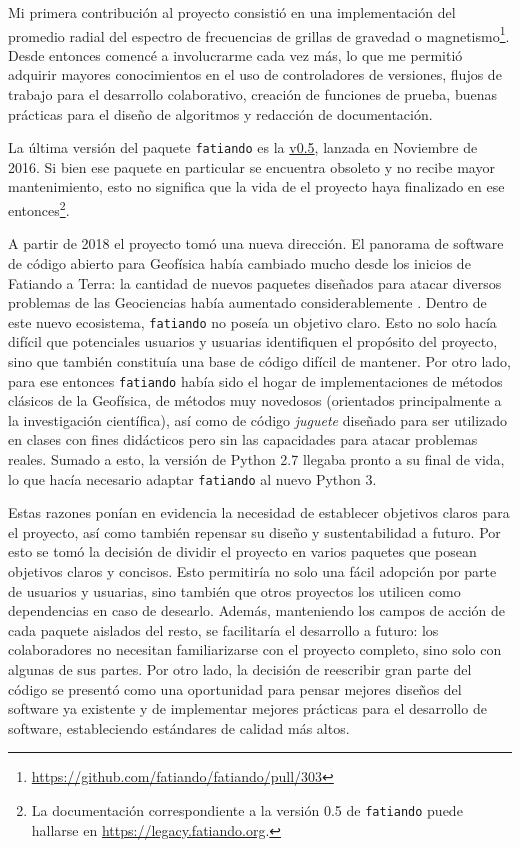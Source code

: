 Mi primera contribución al proyecto consistió en una implementación del promedio
radial del espectro de frecuencias de grillas de gravedad
o magnetismo\footnote{%
    \url{https://github.com/fatiando/fatiando/pull/303}
}.
Desde entonces comencé a involucrarme cada vez más, lo que me permitió adquirir
mayores conocimientos en el uso de controladores de versiones, flujos de
trabajo para el desarrollo colaborativo, creación de funciones de
prueba, buenas prácticas para el diseño de algoritmos y redacción de
documentación.

La última versión del paquete \texttt{fatiando} es la
\href{https://legacy.fatiando.org}{v0.5}, lanzada en Noviembre de
2016.
Si bien ese paquete en particular se encuentra obsoleto y no recibe mayor
mantenimiento, esto no significa que la vida de el proyecto haya finalizado en
ese entonces\footnote{La documentación correspondiente a la versión 0.5 de
\texttt{fatiando} puede hallarse en \url{https://legacy.fatiando.org}.}.

A partir de 2018 el proyecto tomó una nueva dirección.
El panorama de software de código abierto para Geofísica había cambiado mucho
desde los inicios de Fatiando a Terra: la cantidad de nuevos paquetes diseñados
para atacar diversos problemas de las Geociencias había aumentado
considerablemente
\citep{cockett2015, ruecker2017, varga2019, obspy2019}.
Dentro de este nuevo ecosistema, \texttt{fatiando} no poseía un objetivo claro.
Esto no solo hacía difícil que potenciales usuarios y usuarias identifiquen el
propósito del proyecto, sino que también constituía una base de código difícil
de mantener.
Por otro lado, para ese entonces \texttt{fatiando} había sido el hogar de
implementaciones de métodos clásicos de la Geofísica, de métodos muy novedosos
(orientados principalmente a la investigación científica), así como de código
\emph{juguete} diseñado para ser utilizado en clases con fines didácticos pero
sin las capacidades para atacar problemas reales.
Sumado a esto, la versión de Python 2.7 llegaba pronto a su final de vida, lo
que hacía necesario adaptar \texttt{fatiando} al nuevo Python 3.

Estas razones ponían en evidencia la necesidad de establecer objetivos claros
para el proyecto, así como también repensar su diseño y sustentabilidad
a futuro.
Por esto se tomó la decisión de dividir el proyecto en varios paquetes que
posean objetivos claros y concisos.
Esto permitiría no solo una fácil adopción por parte de usuarios y usuarias,
sino también que otros proyectos los utilicen como dependencias en caso de
desearlo.
Además, manteniendo los campos de acción de cada paquete aislados del resto,
se facilitaría el desarrollo a futuro: los colaboradores no necesitan
familiarizarse con el proyecto completo, sino solo con algunas de sus partes.
Por otro lado, la decisión de reescribir gran parte del código se presentó como
una oportunidad para pensar mejores diseños del software ya existente y de
implementar mejores
prácticas para el desarrollo de software, estableciendo estándares de calidad
más altos.


